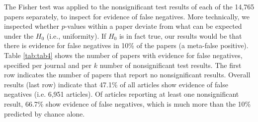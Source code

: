 \documentclass{article}
\begin{document}
The Fisher test was applied to the nonsignificant test results of each of the 14,765 papers separately, to inspect for evidence of false negatives. More technically, we inspected whether $p$-values within a paper deviate from what can be expected under the $H_0$ (i.e., uniformity). If $H_0$ is in fact true, our results would be that there is evidence for false negatives in 10\% of the papers (a meta-false positive). Table \ref{tab:tab4} shows the number of papers with evidence for false negatives, specified per journal and per $k$ number of nonsignificant test results. The first row indicates the number of papers that report no nonsignificant results. Overall results (last row) indicate that 47.1\% of all articles show evidence of false negatives (i.e. 6,951 articles). Of articles reporting at least one nonsignificant result, 66.7\% show evidence of false negatives, which is much more than the 10\% predicted by chance alone.
\end{document}
